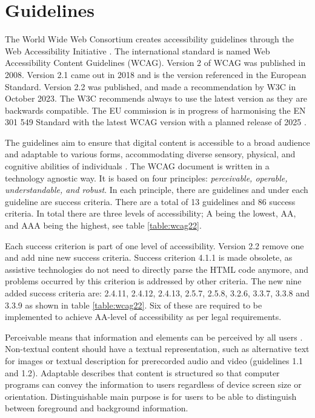 \section{Guidelines}

The World Wide Web Consortium creates accessibility guidelines through the Web Accessibility Initiative \citep{wcagoverview}. The international standard is named Web Accessibility Content Guidelines (WCAG). Version 2 of WCAG was published in 2008. Version 2.1 came out in 2018 and is the version referenced in the European Standard. Version 2.2 was published, and made a recommendation by W3C in October 2023. The W3C recommends always to use the latest version as they are backwards compatible. The EU commission is in progress of harmonising the EN 301 549 Standard with the latest WCAG version with a planned release of 2025 \citep{etsi_standard}.

The guidelines aim to ensure that digital content is accessible to a broad audience and adaptable to various forms, accommodating diverse sensory, physical, and cognitive abilities of individuals \citep{wcag22}. The WCAG document is written in a technology agnostic way. It is based on four principles: \textit{perceivable, operable, understandable, and robust}. In each principle, there are guidelines and under each guideline are success criteria. There are a total of 13 guidelines and 86 success criteria. In total there are three levels of accessibility; A being the lowest, AA, and AAA being the highest, see table \ref{table:wcag22}. 

Each success criterion is part of one level of accessibility. Version 2.2 remove one and add nine new success criteria. Success criterion 4.1.1 is made obsolete, as assistive technologies do not need to directly parse the HTML code anymore, and problems occurred by this criterion is addressed by other criteria. The new nine added success criteria are: 2.4.11, 2.4.12, 2.4.13, 2.5.7, 2.5.8, 3.2.6, 3.3.7, 3.3.8 and 3.3.9 as shown in table \ref{table:wcag22}. Six of these are required to be implemented to achieve AA-level of accessibility as per legal requirements.



Perceivable means that information and elements can be perceived by all users \citep{wcag22}. Non-textual content should have a textual representation, such as alternative text for images or textual description for prerecorded audio and video (guidelines 1.1 and 1.2). Adaptable describes that content is structured so that computer programs can convey the information to users regardless of device screen size or orientation. Distinguishable main purpose is for users to be able to distinguish between foreground and background information.

